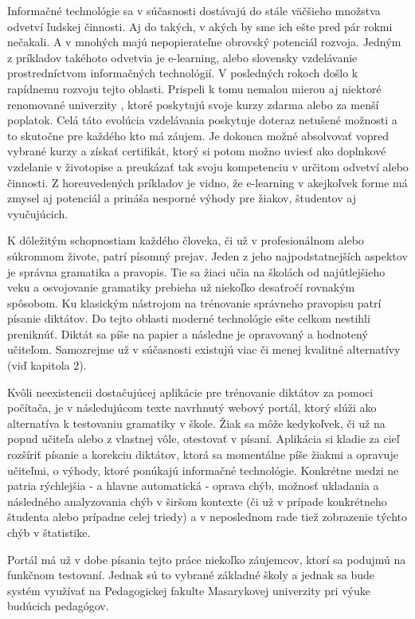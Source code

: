 \documentclass[12pt,oneside]{fithesis2}
\begin{document}
  \par Informačné technológie sa v súčasnosti dostávajú do stále väčšieho množstva odvetví ľudskej činnosti. Aj
do takých, v akých by sme ich ešte pred pár rokmi nečakali. A v mnohých majú nepopierateľne obrovský potenciál
rozvoja. Jedným z príkladov takéhoto odvetvia je e-learning, alebo slovensky vzdelávanie prostredníctvom
informačných technológií. V posledných rokoch došlo k rapídnemu rozvoju tejto oblasti. Prispeli k tomu
      nemalou mierou aj niektoré renomované univerzity \cite{crimson15}, ktoré poskytujú svoje kurzy zdarma alebo za menší poplatok. Celá táto evolúcia vzdelávania poskytuje doteraz netušené možnosti a to skutočne pre každého kto má záujem. Je dokonca možné absolvovať vopred vybrané kurzy a získať certifikát, ktorý si potom možno uviesť ako doplnkové vzdelanie v životopise a preukázať tak svoju kompetenciu v určitom odvetví alebo činnosti. Z horeuvedených príkladov je vidno, že e-learning v akejkoľvek forme má zmysel aj potenciál a prináša nesporné výhody pre žiakov, študentov aj vyučujúcich. 
  \par K dôležitým schopnostiam každého človeka, či už v profesionálnom alebo súkromnom živote, patrí písomný prejav. Jeden z jeho najpodstatnejších aspektov je správna gramatika a pravopis. Tie sa žiaci učia na školách od najútlejšieho veku a osvojovanie gramatiky prebieha už niekoľko desaťročí rovnakým spôsobom. Ku klasickým nástrojom na trénovanie správneho pravopisu patrí písanie diktátov. Do tejto oblasti moderné technológie ešte celkom nestihli preniknúť. Diktát sa píše na papier a následne je opravovaný a hodnotený učiteľom. Samozrejme už v súčasnosti existujú viac či menej kvalitné alternatívy (viď kapitola 2). 
  \par Kvôli neexistencii dostačujúcej aplikácie pre trénovanie diktátov za pomoci počítača, je v následujúcom texte navrhnutý webový portál, ktorý slúži ako alternatíva k testovaniu gramatiky v škole. Žiak sa môže kedykoľvek, či už na popud učiteľa alebo z vlastnej vôle, otestovať v písaní. Aplikácia si kladie za cieľ rozšíriť písanie a korekciu diktátov, ktorá sa momentálne píše žiakmi a opravuje učiteľmi, o výhody, ktoré ponúkajú informačné technológie. Konkrétne medzi ne patria rýchlejšia - a hlavne automatická - oprava chýb, možnosť ukladania a následného analyzovania chýb v širšom kontexte (či už v prípade konkrétneho študenta alebo prípadne celej triedy) a v neposlednom rade tiež zobrazenie týchto chýb v štatistike.
  \par Portál má už v dobe písania tejto práce niekoľko záujemcov, ktorí sa podujmú na funkčnom testovaní. Jednak sú to vybrané základné školy a jednak sa bude systém využívať na Pedagogickej fakulte Masarykovej univerzity pri výuke budúcich pedagógov.
    
\end{document}
